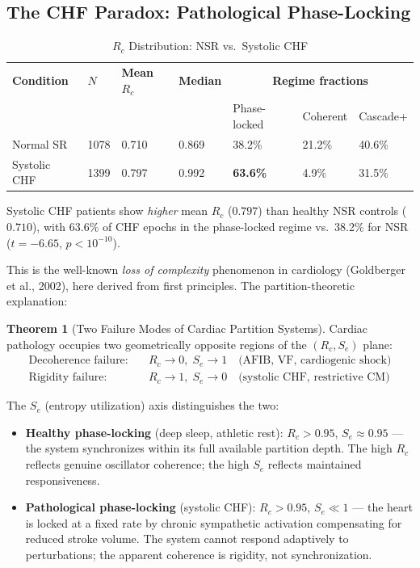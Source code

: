 \documentclass[12pt,a4paper]{article}
\theoremstyle{definition}
\newtheorem{theorem}{Theorem}
\begin{document}
\subsection{The CHF Paradox: Pathological Phase-Locking}

\begin{table}[H]
\centering
\caption{$R_c$ Distribution: NSR vs.\ Systolic CHF}
\label{tab:chf_paradox}
\begin{tabular}{lllllll}
\toprule
\textbf{Condition} & \textbf{$N$} & \textbf{Mean $R_c$} & \textbf{Median} &
\multicolumn{3}{c}{\textbf{Regime fractions}}\\
& & & & Phase-locked & Coherent & Cascade+\\
\midrule
Normal SR  & 1078 & 0.710 & 0.869 & 38.2\% & 21.2\% & 40.6\%\\
Systolic CHF & 1399 & 0.797 & 0.992 & \textbf{63.6\%} & 4.9\% & 31.5\%\\
\bottomrule
\end{tabular}
\end{table}

Systolic CHF patients show \emph{higher} mean $R_c$ ($0.797$) than healthy
NSR controls ($0.710$), with 63.6\% of CHF epochs in the phase-locked regime
vs.\ 38.2\% for NSR ($t = -6.65$, $p < 10^{-10}$).

This is the well-known \emph{loss of complexity} phenomenon in cardiology
(Goldberger et al., 2002), here derived from first principles. The
partition-theoretic explanation:

\begin{theorem}[Two Failure Modes of Cardiac Partition Systems]
\label{thm:two_failure_modes}
Cardiac pathology occupies two geometrically opposite regions of the
$(R_c, S_e)$ plane:
\begin{align}
\text{Decoherence failure:} &\quad R_c \to 0,\; S_e \to 1
\quad \text{(AFIB, VF, cardiogenic shock)}\\
\text{Rigidity failure:} &\quad R_c \to 1,\; S_e \to 0
\quad \text{(systolic CHF, restrictive CM)}
\end{align}
\end{theorem}

The $S_e$ (entropy utilization) axis distinguishes the two:
\begin{itemize}
\item \textbf{Healthy phase-locking} (deep sleep, athletic rest):
  $R_c > 0.95$, $S_e \approx 0.95$ --- the system synchronizes within its
  full available partition depth. The high $R_c$ reflects genuine oscillator
  coherence; the high $S_e$ reflects maintained responsiveness.

\item \textbf{Pathological phase-locking} (systolic CHF):
  $R_c > 0.95$, $S_e \ll 1$ --- the heart is locked at a fixed rate by
  chronic sympathetic activation compensating for reduced stroke volume.
  The system cannot respond adaptively to perturbations; the apparent
  coherence is rigidity, not synchronization.
\end{itemize}
\end{document}
